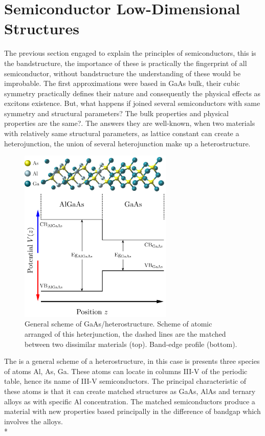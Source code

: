 \section{Semiconductor Low-Dimensional Structures}
\label{sec:chapter-1-low-dimensional-structures}
\vspace{-10mm} 
The previous section engaged to explain the principles of semiconductors, this is the bandstructure, the importance of these is practically the fingerprint of all semiconductor, without bandstructure  the understanding of these would be improbable. The first approximations were based in  GaAs bulk, their cubic symmetry practically defines their nature and consequently the physical effects as excitons existence.  But, what happens  if joined several semiconductors with same symmetry and structural parameters? The bulk properties and physical properties are the same?. 
The answers they are well-known, when two materials with relatively same structural parameters, as lattice constant can create a heterojunction, the union of several heterojunction make up a heterostructure.\\
\begin{figure}[h]
	\centering
	\includegraphics[width=0.65\textwidth]{../figures/chapter-1/heterostructures/out/hs-01}
	\caption{General scheme of GaAs/\algaas heterostructure. Scheme of atomic arranged of this heterjunction, the dashed lines are the matched between two dissimilar
	materials (top). Band-edge profile (bottom).}
	\label{fig:subsection-1.2-heterostructure}
\end{figure}
The  is a general scheme of a heterostructure, in this case is presents three species of atoms Al, As, Ga. These atoms can   locate in columns III-V of the periodic table, hence its name of III-V semiconductors. The principal characteristic of these atoms is that it can create matched structures as GaAs, AlAs and ternary alloys as \algaas with specific Al concentration. The matched semiconductors produce a material with new properties based principally in the difference of bandgap which involves the alloys. \\* 
